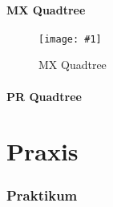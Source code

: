 \documentclass[%
			paper=a4,%
			DIV12, %
			draft=false,%
			titlepage
			]{scrartcl}
\newcommand{\myfig}[4] {
 \begin{figure}
	 \texttt{[image: \#1]}
	 \caption{#4}
	 \label{fig:#2}
 \end{figure}
}
\begin{document}
\subsection{MX Quadtree}
\myfig{img/mxquadtre-full-trimmed}{mxquadtree}{width=.7\textwidth}{MX Quadtree}

\subsection{PR Quadtree}

\part{Praxis}

\section{Praktikum}


\newpage

\nocite{*} %

\end{document}

